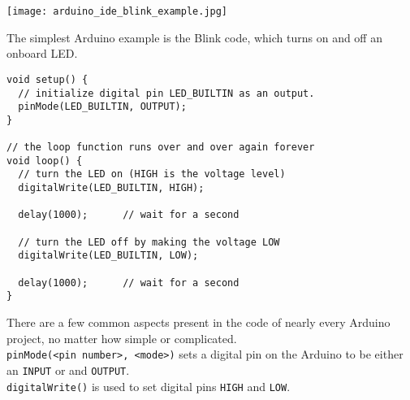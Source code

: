 \documentclass[../TinyBot.tex]{subfiles}
\begin{document}
\begin{center}
    \texttt{[image: arduino\_ide\_blink\_example.jpg]}
    \label{fig:ide-blink}
\end{center}

The simplest Arduino example is the Blink code, which turns on and off an onboard LED.

\begin{lstlisting}
void setup() {
  // initialize digital pin LED_BUILTIN as an output.
  pinMode(LED_BUILTIN, OUTPUT);
}

// the loop function runs over and over again forever
void loop() {
  // turn the LED on (HIGH is the voltage level)
  digitalWrite(LED_BUILTIN, HIGH); 

  delay(1000);      // wait for a second

  // turn the LED off by making the voltage LOW
  digitalWrite(LED_BUILTIN, LOW);  
  
  delay(1000);      // wait for a second
}
\end{lstlisting}


There are a few common aspects present in the code of nearly every Arduino project, no
matter how simple or complicated. \\

\lstinline[]!pinMode(<pin number>, <mode>)! sets a digital pin on the Arduino to be either
an \lstinline[]!INPUT! or and \lstinline[]!OUTPUT!. \\

\lstinline[]!digitalWrite()! is used to set digital pins \lstinline[]!HIGH! and \lstinline[]!LOW!.
\end{document}
